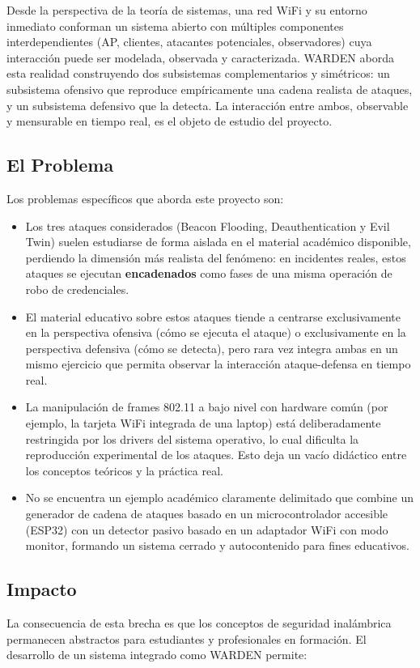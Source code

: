 \documentclass[11pt,a4paper]{article}
\begin{document}
Desde la perspectiva de la teoría de sistemas, una red WiFi y su entorno
inmediato conforman un sistema abierto con múltiples componentes
interdependientes (AP, clientes, atacantes potenciales, observadores) cuya
interacción puede ser modelada, observada y caracterizada. WARDEN aborda esta
realidad construyendo dos subsistemas complementarios y simétricos: un
subsistema ofensivo que reproduce empíricamente una cadena realista de
ataques, y un subsistema defensivo que la detecta. La interacción entre
ambos, observable y mensurable en tiempo real, es el objeto de estudio del
proyecto.

\subsection{El Problema}
Los problemas específicos que aborda este proyecto son:

\begin{itemize}
  \item Los tres ataques considerados (Beacon Flooding, Deauthentication y
    Evil Twin) suelen estudiarse de forma aislada en el material académico
    disponible, perdiendo la dimensión más realista del fenómeno: en
    incidentes reales, estos ataques se ejecutan \textbf{encadenados} como
    fases de una misma operación de robo de credenciales.
  \item El material educativo sobre estos ataques tiende a centrarse
    exclusivamente en la perspectiva ofensiva (cómo se ejecuta el ataque) o
    exclusivamente en la perspectiva defensiva (cómo se detecta), pero rara
    vez integra ambas en un mismo ejercicio que permita observar la
    interacción ataque-defensa en tiempo real.
  \item La manipulación de frames 802.11 a bajo nivel con hardware común
    (por ejemplo, la tarjeta WiFi integrada de una laptop) está deliberadamente
    restringida por los drivers del sistema operativo, lo cual dificulta la
    reproducción experimental de los ataques. Esto deja un vacío didáctico
    entre los conceptos teóricos y la práctica real.
  \item No se encuentra un ejemplo académico claramente delimitado que combine
    un generador de cadena de ataques basado en un microcontrolador accesible
    (ESP32) con un detector pasivo basado en un adaptador WiFi con modo
    monitor, formando un sistema cerrado y autocontenido para fines
    educativos.
\end{itemize}

\subsection{Impacto}
La consecuencia de esta brecha es que los conceptos de seguridad inalámbrica
permanecen abstractos para estudiantes y profesionales en formación. El
desarrollo de un sistema integrado como WARDEN permite:
\end{document}
